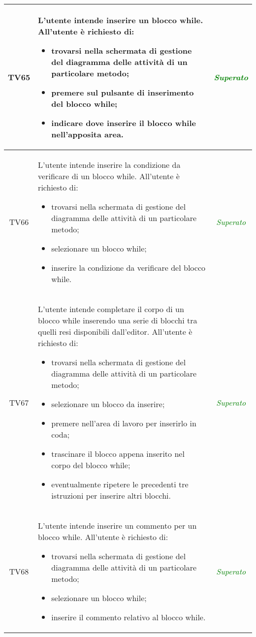 \begin{longtable}{|c|>{}m{8cm}|c|}
\hypertarget{TV4.4}{TV65} & L'utente intende inserire un blocco while.
All'utente è richiesto di:
\begin{itemize}
	\item trovarsi nella schermata di gestione del diagramma delle attività di un particolare metodo;
	\item premere sul pulsante di inserimento del blocco while;
	\item indicare dove inserire il blocco while nell'apposita area.
\end{itemize} & \textcolor{Green}{\textit{Superato}}\\ \hline

\hypertarget{TV4.4.1}{TV66} & L'utente intende inserire la condizione da verificare di un blocco while.
All'utente è richiesto di:
\begin{itemize}
	\item trovarsi nella schermata di gestione del diagramma delle attività di un particolare metodo;
	\item selezionare un blocco while;
	\item inserire la condizione da verificare del blocco while.
\end{itemize} & \textcolor{Green}{\textit{Superato}}\\ \hline

\hypertarget{TV4.4.2}{TV67} & L'utente intende completare il corpo di un blocco while inserendo una serie di blocchi tra quelli resi disponibili dall'editor.
All'utente è richiesto di:
\begin{itemize}
	\item trovarsi nella schermata di gestione del diagramma delle attività di un particolare metodo;
	\item selezionare un blocco da inserire;
	\item premere nell'area di lavoro per inserirlo in coda;
	\item trascinare il blocco appena inserito nel corpo del blocco while;
	\item eventualmente ripetere le precedenti tre istruzioni per inserire altri blocchi.
\end{itemize} & \textcolor{Green}{\textit{Superato}}\\ \hline

\hypertarget{TV4.4.3}{TV68} & L'utente intende inserire un commento per un blocco while.
All'utente è richiesto di:
\begin{itemize}
	\item trovarsi nella schermata di gestione del diagramma delle attività di un particolare metodo;
	\item selezionare un blocco while;
	\item inserire il commento relativo al blocco while.
\end{itemize} & \textcolor{Green}{\textit{Superato}}\\ \hline


\end{longtable}
